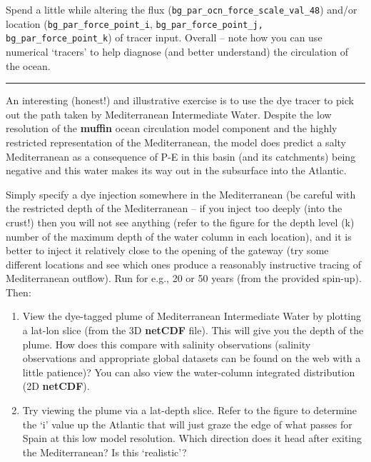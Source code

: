 \documentclass[11pt,fleqn]{book} %
\begin{document}
Spend a little while altering the flux (\texttt{bg\_par\_ocn\_force\_scale\_val\_48}) and/or location (\texttt{bg\_par\_force\_point\_i}, \texttt{bg\_par\_force\_point\_j, bg\_par\_force\_point\_k}) of tracer input. Overall -- note how you can use numerical ‘tracers’ to help diagnose (and better understand) the circulation of the ocean.

\hfill \break
\noindent\rule{4cm}{0.1mm}
\hfill \break

\noindent An interesting (honest!) and illustrative exercise is to use the dye tracer to pick out the path taken by Mediterranean Intermediate Water. Despite the low resolution of the \textbf{muffin} ocean circulation model component and the highly restricted representation of the Mediterranean, the model does predict a salty Mediterranean as a consequence of P-E in this basin (and its catchments) being negative and this water makes its way out in the subsurface into the Atlantic.

Simply specify a dye injection somewhere in the Mediterranean (be careful with the restricted depth of the Mediterranean – if you inject too deeply (into the crust!) then you will not see anything (refer to the figure for the depth level (k) number of the maximum depth of the water column in each location), and it is better to inject it relatively close to the opening of the gateway (try some different locations and see which ones produce a reasonably instructive tracing of Mediterranean outflow). Run for e.g., 20 or 50 years (from the provided spin-up). Then:

\vspace{1mm}
\begin{enumerate}[noitemsep]
\vspace{1mm}
\item View the dye-tagged plume of Mediterranean Intermediate Water by plotting a lat-lon slice (from the 3D \textbf{netCDF} file). This will give you the depth of the plume. How does this compare with salinity observations (salinity observations and appropriate global datasets can be found on the web with a little patience)? You can also view the water-column integrated distribution (2D \textbf{netCDF}).
\vspace{1mm}
\item Try viewing the plume via a lat-depth slice. Refer to the figure to determine the ‘i’ value up the Atlantic that will just graze the edge of what passes for Spain at this low model resolution. Which direction does it head after exiting the Mediterranean? Is this ‘realistic’?
\end{enumerate}
\vspace{1mm}
\end{document}
